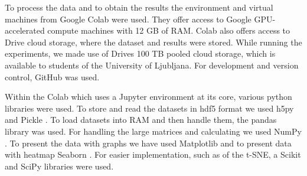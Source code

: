 To process the data and to obtain the results the environment and virtual machines from Google Colab \cite{colab} were used.
They offer access to Google GPU-accelerated compute machines with 12 GB of RAM. 
Colab also offers access to Drive cloud storage, where the dataset and results were stored.
While running the experiments, we made use of Drives 100 TB pooled cloud storage, which is available to students of the University of Ljubljana. 
For development and version control, GitHub was used. 

Within the Colab which uses a Jupyter \cite{jupyter} environment at its core, various python libraries were used.
To store and read the datasets in hdf5 format we used h5py  \cite{hdf5} and Pickle  \cite{pickle}.
To load datasets into RAM and then handle them, the pandas  \cite{pandas} library was used.
For handling the large matrices and calculating we used NumPy  \cite{numpy}.
To present the data with graphs we have used Matplotlib  \cite{matplotlib} and to present data with heatmap Seaborn  \cite{seaborn}.
For easier implementation, such as of the t-SNE, a Scikit  \cite{scikit} and SciPy  \cite{scipy} libraries were used.
